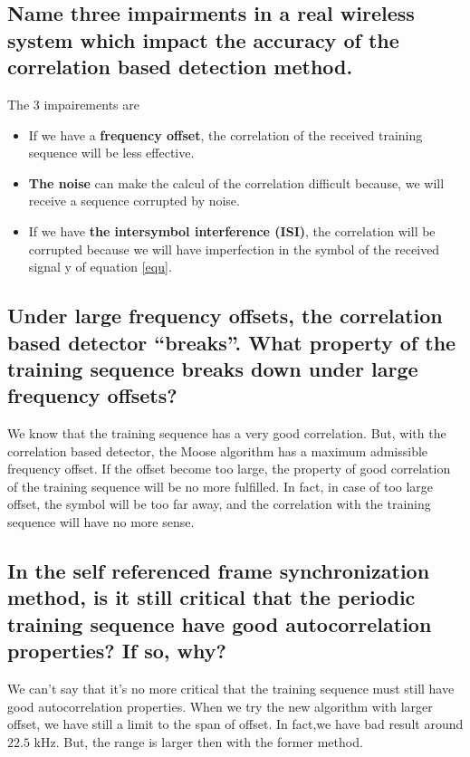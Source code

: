 \documentclass[frenchb, oneside, headings=normal]{scrartcl}
\begin{document}
\subsection{Name three impairments in a real wireless system which impact the accuracy of the correlation based detection method.}

The 3 impairements are 

\begin{itemize}

\item If we have a \textbf{frequency offset}, the correlation of the received training sequence will be less effective.

\item \textbf{The noise} can make the calcul of the correlation difficult because, we will receive a sequence corrupted by noise.

\item If we have \textbf{the intersymbol interference (ISI)}, the correlation will be corrupted because we will have imperfection in the symbol of the received signal y of equation \ref{equ}.
\end{itemize}

\subsection{Under large frequency offsets, the correlation based detector “breaks”. What property of the training sequence breaks down under large frequency offsets?}

We know that the training sequence has a very good correlation. But, with the correlation based detector, the Moose algorithm has a maximum admissible frequency offset. If the offset become too large, the property of good correlation of the training sequence will be no more fulfilled. In fact, in case of too large offset, the symbol will be too far away, and the correlation with the training sequence will have no more sense.

\subsection{In the self referenced frame synchronization method, is it still critical that the periodic training sequence have good autocorrelation properties? If so, why?}

We can't say that it's no more critical that the training sequence must still have good autocorrelation properties. When we try the new algorithm with larger offset, we have still a limit to the span of offset. In fact,we have bad result around $22.5$ \si{\kilo\hertz}. But, the range is larger then with the former method.
\end{document}
